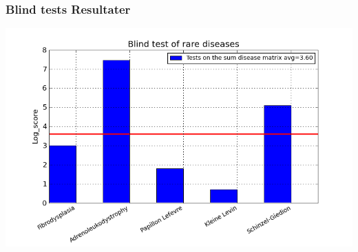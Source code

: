\documentclass[xcolor=table]{beamer}
\begin{document}
\begin{frame}

  \frametitle{Blind tests Resultater}

  \begin{center}
    \includegraphics[width=1.0\textwidth]{diagram/blind_test}
  \end{center}

\end{frame}
\end{document}
